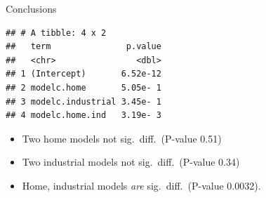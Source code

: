 \documentclass[
  ignorenonframetext,
]{beamer}
\newenvironment{Shaded}{\begin{snugshade}}{\end{snugshade}}
\newcommand{\FloatTok}[1]{\textcolor[rgb]{0.00,0.00,0.81}{#1}}
\newcommand{\KeywordTok}[1]{\textcolor[rgb]{0.13,0.29,0.53}{\textbf{#1}}}
\newcommand{\NormalTok}[1]{#1}
\newcommand{\OperatorTok}[1]{\textcolor[rgb]{0.81,0.36,0.00}{\textbf{#1}}}
\newcommand{\StringTok}[1]{\textcolor[rgb]{0.31,0.60,0.02}{#1}}
\begin{document}
\begin{frame}[fragile]{Conclusions}
\protect\hypertarget{conclusions-2}{}

\begin{Shaded}
\end{Shaded}

\begin{verbatim}
## # A tibble: 4 x 2
##   term               p.value
##   <chr>                <dbl>
## 1 (Intercept)       6.52e-12
## 2 modelc.home       5.05e- 1
## 3 modelc.industrial 3.45e- 1
## 4 modelc.home.ind   3.19e- 3
\end{verbatim}

\begin{itemize}
\item
  Two home models not sig.~diff.~(P-value 0.51)
\item
  Two industrial models not sig.~diff.~(P-value 0.34)
\item
  Home, industrial models \emph{are} sig.~diff.~(P-value 0.0032).
\end{itemize}

\end{frame}
\end{document}
